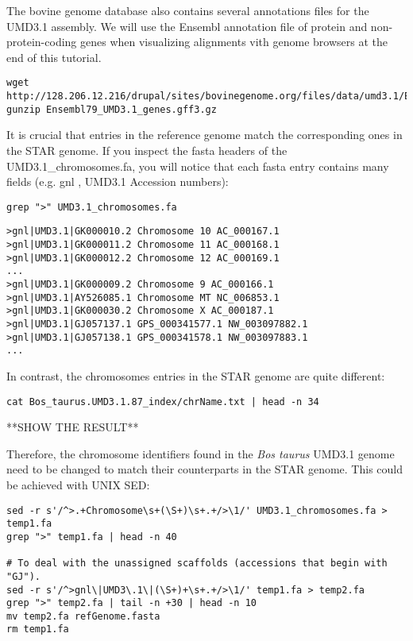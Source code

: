 The bovine genome database also contains several annotations files for the UMD3.1 assembly. We will use the Ensembl annotation file of protein and non-protein-coding genes when visualizing alignments vith genome browsers at the end of this tutorial.

\begin{verbatim}
wget http://128.206.12.216/drupal/sites/bovinegenome.org/files/data/umd3.1/Ensembl79_UMD3.1_genes.gff3.gz
gunzip Ensembl79_UMD3.1_genes.gff3.gz
\end{verbatim}


It is crucial that entries in the reference genome match the corresponding ones in the STAR genome. If you inspect the fasta headers of the UMD3.1\_chromosomes.fa, you will notice that each fasta entry contains many fields (e.g. gnl , UMD3.1 Accession numbers):

\begin{verbatim}
grep ">" UMD3.1_chromosomes.fa
\end{verbatim}


\begin{verbatim}
>gnl|UMD3.1|GK000010.2 Chromosome 10 AC_000167.1
>gnl|UMD3.1|GK000011.2 Chromosome 11 AC_000168.1
>gnl|UMD3.1|GK000012.2 Chromosome 12 AC_000169.1
...
>gnl|UMD3.1|GK000009.2 Chromosome 9 AC_000166.1
>gnl|UMD3.1|AY526085.1 Chromosome MT NC_006853.1
>gnl|UMD3.1|GK000030.2 Chromosome X AC_000187.1
>gnl|UMD3.1|GJ057137.1 GPS_000341577.1 NW_003097882.1
>gnl|UMD3.1|GJ057138.1 GPS_000341578.1 NW_003097883.1
...
\end{verbatim}

In contrast, the chromosomes entries in the STAR genome are quite different:

\begin{verbatim}
cat Bos_taurus.UMD3.1.87_index/chrName.txt | head -n 34
\end{verbatim}

**SHOW THE RESULT**

Therefore, the chromosome identifiers found in the \textit{Bos taurus} UMD3.1 genome need to be changed to match their counterparts in the STAR genome. This could be achieved with UNIX SED:

\begin{verbatim}
sed -r s'/^>.+Chromosome\s+(\S+)\s+.+/>\1/' UMD3.1_chromosomes.fa > temp1.fa
grep ">" temp1.fa | head -n 40

# To deal with the unassigned scaffolds (accessions that begin with "GJ").
sed -r s'/^>gnl\|UMD3\.1\|(\S+)+\s+.+/>\1/' temp1.fa > temp2.fa
grep ">" temp2.fa | tail -n +30 | head -n 10
mv temp2.fa refGenome.fasta
rm temp1.fa
\end{verbatim}

